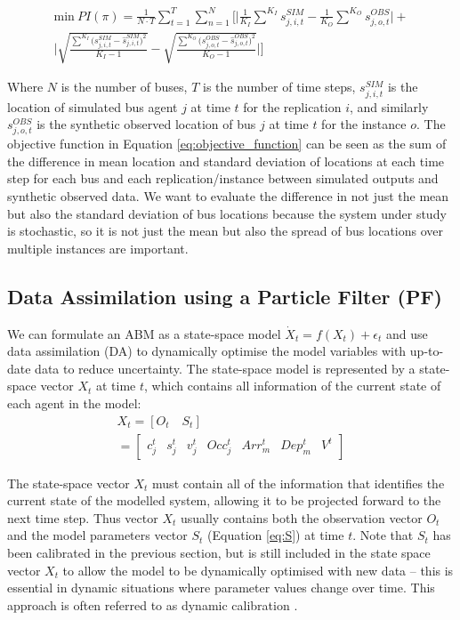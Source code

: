 \begin{align}
    \text{min} \ PI(\pi) = \frac{1}{N \cdot T} \sum_{t=1}^T \sum_{n=1}^N \Bigg[ \bigg|  \frac{1}{K_I} \sum^{K_I}  s_{j,i,t}^{SIM}  - \frac{1}{K_O} \sum^{K_O}  s_{j,o,t}^{OBS} \bigg| + \nonumber \\
    \bigg| \sqrt{\frac{\sum^{K_I} \big( s_{j,i,t}^{SIM} - \hat{s}_{j,i,t}^{SIM} \big)^2}{K_I-1}}  - \sqrt{\frac{\sum^{K_O} \big( s_{j,o,t}^{OBS} - \hat{s}_{j,o,t}^{OBS} \big)^2}{K_O-1}} \bigg|   \Bigg]
    \label{eq:objective_function}
\end{align}

Where $N$ is the number of buses, $T$ is the number of time steps, $s_{j,i,t}^{SIM}$ is the location of simulated bus agent $j$ at time $t$ for the replication $i$, and similarly $s_{j,o,t}^{OBS}$ is the synthetic observed location of bus $j$ at time $t$ for the instance $o$. The objective function in Equation \ref{eq:objective_function} can be seen as the sum of the difference in mean location and standard deviation of locations at each time step for each bus and each replication/instance between simulated outputs and synthetic observed data. We want to evaluate the difference in not just the mean but also the standard deviation of bus locations because the system under study is stochastic, so it is not just the mean but also the spread of bus locations over multiple instances are important. 

\subsection{Data Assimilation using a Particle Filter (PF)}
\label{s:PF}

We can formulate an ABM as a state-space model $\dot{X}_t = f(X_{t}) + \epsilon_t$ and use data assimilation (DA) to dynamically optimise the model variables with up-to-date data to reduce uncertainty. The state-space model is represented by a state-space vector $X_t$ at time $t$, which contains all information of the current state of each agent in the model: 
\begin{align}
    X_t = \left[ O_t \quad S_t \right] \nonumber \\
    =\left[ \begin{array}{ccccccc}
c_j^t & s_j^t & v_j^t & Occ_j^t & Arr_m^t & Dep_m^t & V^t \end{array} \right] 
\label{eq:state_vector}
\end{align}
  
The state-space vector $X_t$ must contain all of the information that identifies the current state of the modelled system, allowing it to be projected forward to the next time step. Thus vector $X_t$ usually contains both the observation vector $O_t$ and the model parameters vector $S_t$ (Equation \ref{eq:S}) at time $t$. Note that $S_t$ has been calibrated in the previous section, but is still included in the state space vector $X_t$ to allow the model to be dynamically optimised with new data -- this is essential in dynamic situations where parameter values change over time. This approach is often referred to as dynamic calibration \citep{eicker2014calibration}.

